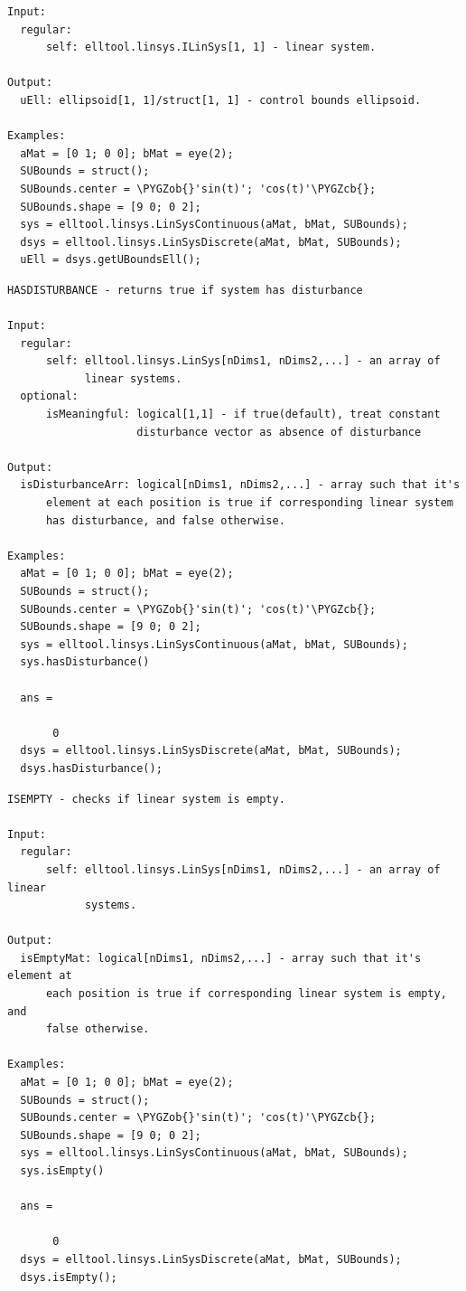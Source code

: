 \documentclass[letterpaper,10pt,english]{sphinxmanual}
\def\PYGZob{\char`\{}
\def\PYGZcb{\char`\}}
\begin{document}
\label{chap_func:elltool-linsys-alinsys-getuboundsell}
\begin{Verbatim}[commandchars=\\\{\}]
Input:
  regular:
      self: elltool.linsys.ILinSys[1, 1] - linear system.

Output:
  uEll: ellipsoid[1, 1]/struct[1, 1] - control bounds ellipsoid.

Examples:
  aMat = [0 1; 0 0]; bMat = eye(2);
  SUBounds = struct();
  SUBounds.center = \PYGZob{}'sin(t)'; 'cos(t)'\PYGZcb{};
  SUBounds.shape = [9 0; 0 2];
  sys = elltool.linsys.LinSysContinuous(aMat, bMat, SUBounds);
  dsys = elltool.linsys.LinSysDiscrete(aMat, bMat, SUBounds);
  uEll = dsys.getUBoundsEll();
\end{Verbatim}
\label{chap_func:elltool-linsys-alinsys-hasdisturbance}
\begin{Verbatim}[commandchars=\\\{\}]
HASDISTURBANCE - returns true if system has disturbance

Input:
  regular:
      self: elltool.linsys.LinSys[nDims1, nDims2,...] - an array of
            linear systems.
  optional:
      isMeaningful: logical[1,1] - if true(default), treat constant
                    disturbance vector as absence of disturbance

Output:
  isDisturbanceArr: logical[nDims1, nDims2,...] - array such that it's
      element at each position is true if corresponding linear system
      has disturbance, and false otherwise.

Examples:
  aMat = [0 1; 0 0]; bMat = eye(2);
  SUBounds = struct();
  SUBounds.center = \PYGZob{}'sin(t)'; 'cos(t)'\PYGZcb{};
  SUBounds.shape = [9 0; 0 2];
  sys = elltool.linsys.LinSysContinuous(aMat, bMat, SUBounds);
  sys.hasDisturbance()

  ans =

       0
  dsys = elltool.linsys.LinSysDiscrete(aMat, bMat, SUBounds);
  dsys.hasDisturbance();
\end{Verbatim}
\label{chap_func:elltool-linsys-alinsys-isempty}
\begin{Verbatim}[commandchars=\\\{\}]
ISEMPTY - checks if linear system is empty.

Input:
  regular:
      self: elltool.linsys.LinSys[nDims1, nDims2,...] - an array of linear
            systems.

Output:
  isEmptyMat: logical[nDims1, nDims2,...] - array such that it's element at
      each position is true if corresponding linear system is empty, and
      false otherwise.

Examples:
  aMat = [0 1; 0 0]; bMat = eye(2);
  SUBounds = struct();
  SUBounds.center = \PYGZob{}'sin(t)'; 'cos(t)'\PYGZcb{};
  SUBounds.shape = [9 0; 0 2];
  sys = elltool.linsys.LinSysContinuous(aMat, bMat, SUBounds);
  sys.isEmpty()

  ans =

       0
  dsys = elltool.linsys.LinSysDiscrete(aMat, bMat, SUBounds);
  dsys.isEmpty();
\end{Verbatim}
\end{document}
